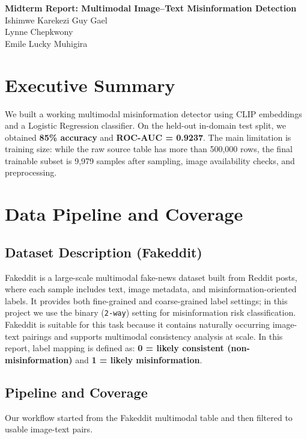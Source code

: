 \documentclass[a4paper,10.5pt,twoside]{article}
\begin{document}

\begin{center}
{\Large \textbf{Midterm Report: Multimodal Image--Text Misinformation Detection}}\\[12pt]
{\normalsize
Ishimwe Karekezi Guy Gael\\
Lynne Chepkwony\\
Emile Lucky Muhigira
}
\end{center}

\section{Executive Summary}
We built a working multimodal misinformation detector using CLIP embeddings \cite{radford2021clip} and a Logistic Regression classifier.
On the held-out in-domain test split, we obtained \textbf{85\% accuracy} and \textbf{ROC-AUC = 0.9237}.
The main limitation is training size: while the raw source table has more than 500,000 rows, the final trainable subset is 9,979 samples after sampling, image availability checks, and preprocessing.

\section{Data Pipeline and Coverage}
\subsection{Dataset Description (Fakeddit)}
Fakeddit is a large-scale multimodal fake-news dataset built from Reddit posts, where each sample includes text, image metadata, and misinformation-oriented labels.
It provides both fine-grained and coarse-grained label settings; in this project we use the binary (\texttt{2-way}) setting for misinformation risk classification.
Fakeddit is suitable for this task because it contains naturally occurring image-text pairings and supports multimodal consistency analysis at scale.
In this report, label mapping is defined as: \textbf{0 = likely consistent (non-misinformation)} and \textbf{1 = likely misinformation}.

\subsection{Pipeline and Coverage}
Our workflow started from the Fakeddit multimodal table \cite{nakamura2019fakeddit} and then filtered to usable image-text pairs.
\end{document}
